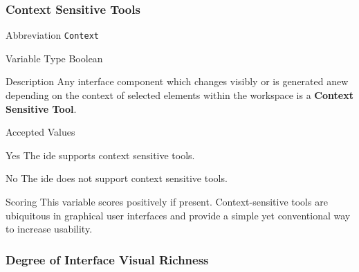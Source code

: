 \subsubsection{Context Sensitive Tools}
\label{subsubsec:context}

\begin{AlignedDesc}
  \item[Abbreviation] \texttt{Context}

  \item[Variable Type] Boolean

  \item[Description] Any interface component which changes visibly or is
  generated anew depending on the context of selected elements within the
  workspace is a \textbf{Context Sensitive Tool}.

  \item[Accepted Values]

  \begin{AlignedDesc}
    \item[Yes] The \ac{ide} supports context sensitive tools.
    \item[No] The \ac{ide} does not support context sensitive tools.
  \end{AlignedDesc}

  \item[Scoring] This variable scores positively if present.
  Context-sensitive tools are ubiquitous in graphical user interfaces and
  provide a simple yet conventional way to increase usability.

\end{AlignedDesc}

\subsubsection{Degree of Interface Visual Richness}
\label{subsubsec:toolrichness}

